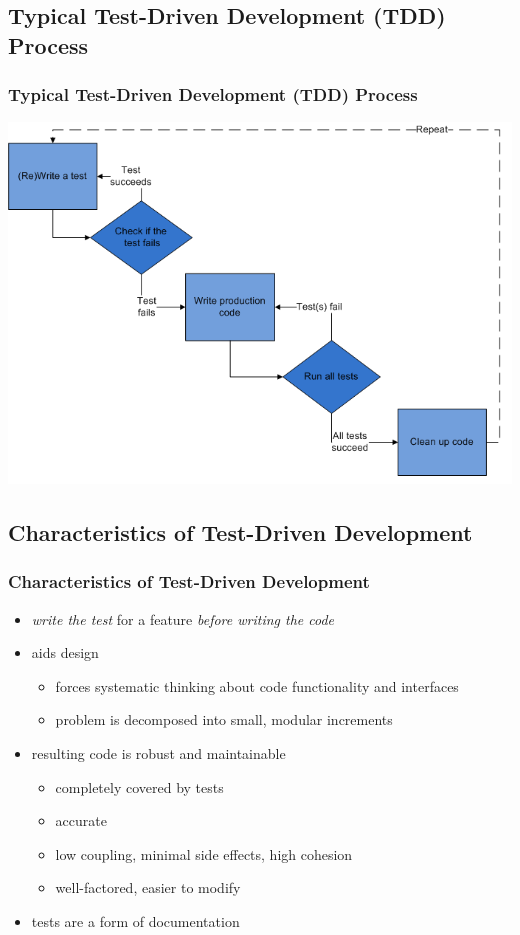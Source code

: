 \documentclass{beamer}
\begin{document}
\subsection{Typical Test-Driven Development (TDD) Process}
\begin{frame}
  \frametitle{Typical Test-Driven Development (TDD) Process\cite{tdd-wikipedia}}
  \includegraphics[scale=0.45]{fig/test-driven_development.png}
\end{frame}

\subsection{Characteristics of Test-Driven Development}
\begin{frame}
  \frametitle{Characteristics of Test-Driven Development}
  \begin{itemize}
    \item \textit{write the test} for a feature \textit{before writing the code}
    \item aids design
      \begin{itemize}
        \item forces systematic thinking about code functionality and interfaces
        \item problem is decomposed into small, modular increments
      \end{itemize}
    \item resulting code is robust and maintainable 
      \begin{itemize}
        \item completely covered by tests
        \item accurate
        \item low coupling, minimal side effects, high cohesion
        \item well-factored, easier to modify
      \end{itemize}
    \item tests are a form of documentation
  \end{itemize}
\end{frame}
\end{document}
